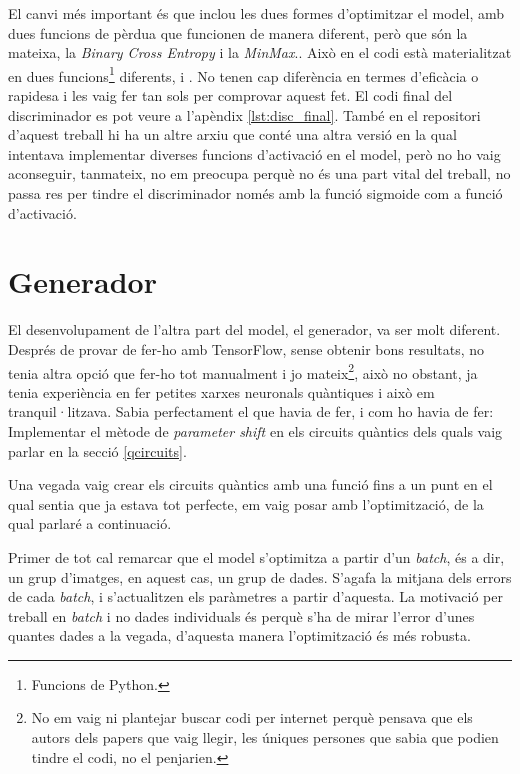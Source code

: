 El canvi més important és que inclou les dues formes d'optimitzar el model, amb dues funcions de pèrdua que funcionen de manera diferent, però que són la mateixa, la \textit{Binary Cross Entropy} i la \textit{MinMax}.. Això en el codi està materialitzat en dues funcions\footnote{Funcions de Python.} diferents,  i . No tenen cap diferència en termes d'eficàcia o rapidesa i les vaig fer tan sols per comprovar aquest fet. El codi final del discriminador es pot veure a l'apèndix \ref{lst:disc_final}. També en el repositori d'aquest treball hi ha un altre arxiu que conté una altra versió en la qual intentava implementar diverses funcions d'activació en el model, però no ho vaig aconseguir, tanmateix, no em preocupa perquè no és una part vital del treball, no passa res per tindre el discriminador només amb la funció sigmoide com a funció d'activació.

\section{Generador}

El desenvolupament de l'altra part del model, el generador, va ser molt diferent. Després de provar de fer-ho amb TensorFlow, sense obtenir bons resultats, no tenia altra opció que fer-ho tot manualment i jo mateix\footnote{No em vaig ni plantejar buscar codi per internet perquè pensava que els autors dels papers que vaig llegir, les úniques persones que sabia que podien tindre el codi, no el penjarien.}, això no obstant, ja tenia experiència en fer petites xarxes neuronals quàntiques i això em tranquil·litzava. Sabia perfectament el que havia de fer, i com ho havia de fer: Implementar el mètode de \textit{parameter shift} en els circuits quàntics dels quals vaig parlar en la secció \ref{qcircuits}.

Una vegada vaig crear els circuits quàntics amb una funció fins a un punt en el qual sentia que ja estava tot perfecte, em vaig posar amb l'optimització, de la qual parlaré a continuació.

Primer de tot cal remarcar que el model s'optimitza a partir d'un \textit{batch}, és a dir, un grup d'imatges, en aquest cas, un grup de dades. S'agafa la mitjana dels errors de cada \textit{batch}, i s'actualitzen els paràmetres a partir d'aquesta. La motivació per treball en \textit{batch} i no dades individuals és perquè s'ha de mirar l'error d'unes quantes dades a la vegada, d'aquesta manera l'optimització és més robusta.

